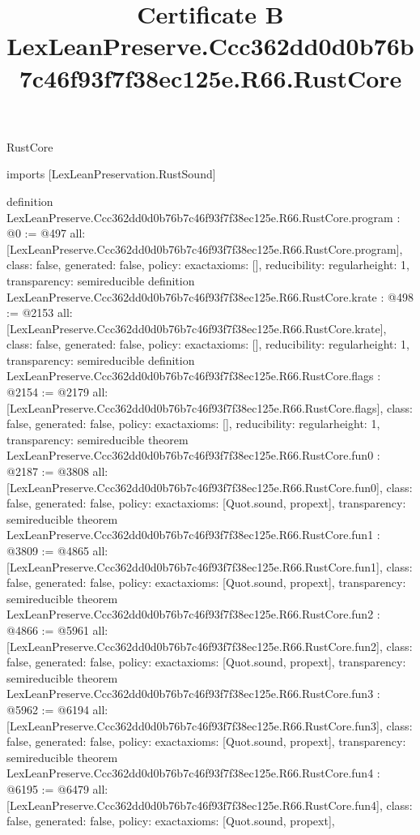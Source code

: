 \begin{lexlean}{RustCore}
\title{Certificate B LexLeanPreserve.Ccc362dd0d0b76b7c46f93f7f38ec125e.R66.RustCore}
\begin{coremodule}
imports [LexLeanPreservation.RustSound]

definition LexLeanPreserve.Ccc362dd0d0b76b7c46f93f7f38ec125e.R66.RustCore.program : @0 := @497 {
  all: [LexLeanPreserve.Ccc362dd0d0b76b7c46f93f7f38ec125e.R66.RustCore.program],
  class: false,
  generated: false,
  policy: exact{axioms: []},
  reducibility: regular{height: 1},
  transparency: semireducible
}
definition LexLeanPreserve.Ccc362dd0d0b76b7c46f93f7f38ec125e.R66.RustCore.krate : @498 := @2153 {
  all: [LexLeanPreserve.Ccc362dd0d0b76b7c46f93f7f38ec125e.R66.RustCore.krate],
  class: false,
  generated: false,
  policy: exact{axioms: []},
  reducibility: regular{height: 1},
  transparency: semireducible
}
definition LexLeanPreserve.Ccc362dd0d0b76b7c46f93f7f38ec125e.R66.RustCore.flags : @2154 := @2179 {
  all: [LexLeanPreserve.Ccc362dd0d0b76b7c46f93f7f38ec125e.R66.RustCore.flags],
  class: false,
  generated: false,
  policy: exact{axioms: []},
  reducibility: regular{height: 1},
  transparency: semireducible
}
theorem LexLeanPreserve.Ccc362dd0d0b76b7c46f93f7f38ec125e.R66.RustCore.fun0 : @2187 := @3808 {
  all: [LexLeanPreserve.Ccc362dd0d0b76b7c46f93f7f38ec125e.R66.RustCore.fun0],
  class: false,
  generated: false,
  policy: exact{axioms: [Quot.sound, propext]},
  transparency: semireducible
}
theorem LexLeanPreserve.Ccc362dd0d0b76b7c46f93f7f38ec125e.R66.RustCore.fun1 : @3809 := @4865 {
  all: [LexLeanPreserve.Ccc362dd0d0b76b7c46f93f7f38ec125e.R66.RustCore.fun1],
  class: false,
  generated: false,
  policy: exact{axioms: [Quot.sound, propext]},
  transparency: semireducible
}
theorem LexLeanPreserve.Ccc362dd0d0b76b7c46f93f7f38ec125e.R66.RustCore.fun2 : @4866 := @5961 {
  all: [LexLeanPreserve.Ccc362dd0d0b76b7c46f93f7f38ec125e.R66.RustCore.fun2],
  class: false,
  generated: false,
  policy: exact{axioms: [Quot.sound, propext]},
  transparency: semireducible
}
theorem LexLeanPreserve.Ccc362dd0d0b76b7c46f93f7f38ec125e.R66.RustCore.fun3 : @5962 := @6194 {
  all: [LexLeanPreserve.Ccc362dd0d0b76b7c46f93f7f38ec125e.R66.RustCore.fun3],
  class: false,
  generated: false,
  policy: exact{axioms: [Quot.sound, propext]},
  transparency: semireducible
}
theorem LexLeanPreserve.Ccc362dd0d0b76b7c46f93f7f38ec125e.R66.RustCore.fun4 : @6195 := @6479 {
  all: [LexLeanPreserve.Ccc362dd0d0b76b7c46f93f7f38ec125e.R66.RustCore.fun4],
  class: false,
  generated: false,
  policy: exact{axioms: [Quot.sound, propext]},
}
\end{coremodule}
\end{lexlean}
